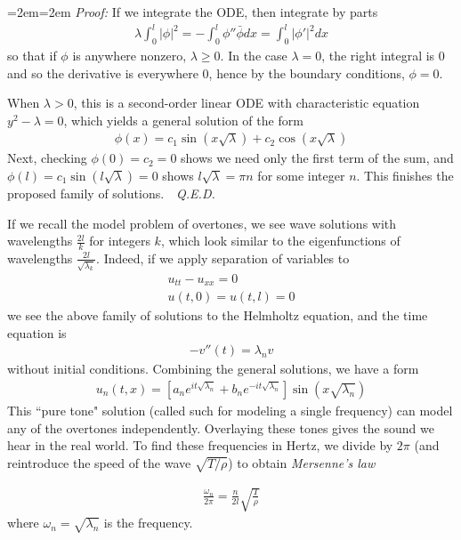 \documentclass{article}
\newenvironment{pf}{%
	\par%
	\medskip
	\leftskip=2em\rightskip=2em%
	\noindent\ignorespaces \textit{Proof:} \newline}{%
	\,\, \newline \textit{Q.E.D.}\par\medskip}
\begin{document}
	\begin{pf}
		If we integrate the ODE, then integrate by parts
		\begin{align*}
			\lambda \int_{0}^{l} |\phi|^{2} = - \int_{0}^{l} \phi'' \bar{\phi} dx = \int_{0}^{l} |\phi ' |^{2} dx
		\end{align*}
		so that if $\phi$ is anywhere nonzero, $\lambda \geq 0$. In the case $\lambda = 0$, the right integral is $0$ and so the derivative is everywhere $0$, hence by the boundary conditions, $\phi = 0$. 
		
		When $\lambda > 0$, this is a second-order linear ODE with characteristic equation $y^{2}- \lambda=0$, which yields a general solution of the form 
		\begin{align*}
			\phi(x) = c_1 \sin(x\sqrt{\lambda}) + c_{2} \cos(x\sqrt{\lambda})
		\end{align*} 
		Next, checking $\phi(0) = c_2 = 0$ shows we need only the first term of the sum, and $\phi(l) = c_{1}\sin(l\sqrt{\lambda}) = 0$ shows $l\sqrt{\lambda} = \pi n$ for some integer $n$. This finishes the proposed family of solutions. 
	\end{pf}
	
	If we recall the model problem of overtones, we see wave solutions with wavelengths $\frac{2l}{k}$ for integers $k$, which look similar to the eigenfunctions of wavelengths $\frac{2l}{\sqrt{\lambda_k}}$. Indeed, if we apply separation of variables to 
	\begin{align*}
		u_{tt} - u_{xx} = 0 \\
		u(t,0) = u(t,l) = 0
	\end{align*}
	we see the above family of solutions to the Helmholtz equation, and the time equation is 
	\begin{align*}
		-v''(t) = \lambda_{n} v
	\end{align*}
	without initial conditions. Combining the general solutions, we have a form
	\begin{align*}
		u_{n}(t,x) = \left[ a_{n} e^{it \sqrt{\lambda_{n}}} + b_{n} e^{-it\sqrt{\lambda_n}}\right] \sin(x\sqrt{\lambda_{n}})
	\end{align*}
	This ``pure tone" solution (called such for modeling a single frequency) can model any of the overtones independently. Overlaying these tones gives the sound we hear in the real world. To find these frequencies in Hertz, we divide by $2 \pi$ (and reintroduce the speed of the wave $\sqrt{T/\rho}$) to obtain \textit{Mersenne's law}
	
	\begin{align*}
		\frac{\omega_{n}}{2\pi} = \frac{n}{2l} \sqrt{\frac{T}{\rho}}
	\end{align*}
	where $\omega_{n} = \sqrt{\lambda_{n}}$ is the frequency. 
	
\end{document}
